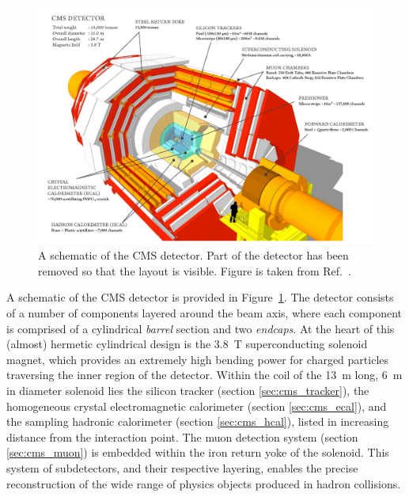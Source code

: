 \begin{figure}[htb!]
  \centering
  \includegraphics[width=1\textwidth]{Figures/cms/cms_detector.pdf}
  \caption[The CMS detector]
  {
    A schematic of the CMS detector. Part of the detector has been removed so that the layout is visible. Figure is taken from Ref.~\cite{Sakuma_2014}.
  }
  \label{fig:cms_detector}
\end{figure}

A schematic of the CMS detector is provided in Figure~\ref{fig:cms_detector}. The detector consists of a number of components layered around the beam axis, where each component is comprised of a cylindrical \textit{barrel} section and two \textit{endcaps}. At the heart of this (almost) hermetic cylindrical design is the 3.8~T superconducting solenoid magnet, which provides an extremely high bending power for charged particles traversing the inner region of the detector. Within the coil of the 13~m long, 6~m in diameter solenoid lies the silicon tracker (section \ref{sec:cms_tracker}), the homogeneous crystal electromagnetic calorimeter (section \ref{sec:cms_ecal}), and the sampling hadronic calorimeter (section \ref{sec:cms_hcal}), listed in increasing distance from the interaction point. The muon detection system (section \ref{sec:cms_muon}) is embedded within the iron return yoke of the solenoid. This system of subdetectors, and their respective layering, enables the precise reconstruction of the wide range of physics objects produced in hadron collisions.


